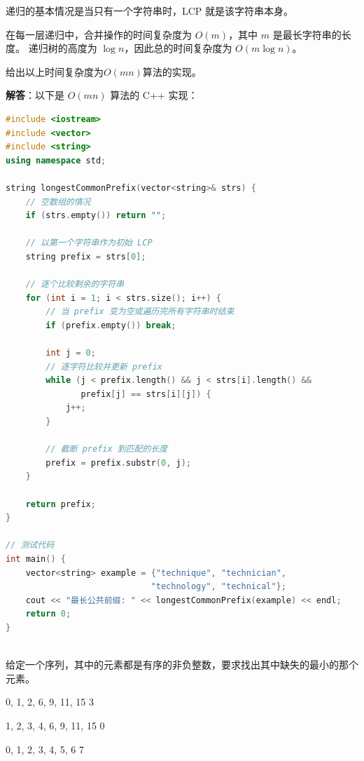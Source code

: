 \documentclass[12pt,twoside]{article}
\begin{document}
\begin{problems}
递归的基本情况是当只有一个字符串时，LCP 就是该字符串本身。

在每一层递归中，合并操作的时间复杂度为 $O(m)$，其中 $m$ 是最长字符串的长度。
递归树的高度为 $\log n$，因此总的时间复杂度为 $O(m \log n)$。

\ppart 给出以上时间复杂度为$O(mn)$算法的实现。

\textbf{解答}：以下是 $O(mn)$ 算法的 C++ 实现：

\begin{lstlisting}[language=C++]
#include <iostream>
#include <vector>
#include <string>
using namespace std;

string longestCommonPrefix(vector<string>& strs) {
    // 空数组的情况
    if (strs.empty()) return "";
    
    // 以第一个字符串作为初始 LCP
    string prefix = strs[0];
    
    // 逐个比较剩余的字符串
    for (int i = 1; i < strs.size(); i++) {
        // 当 prefix 变为空或遍历完所有字符串时结束
        if (prefix.empty()) break;
        
        int j = 0;
        // 逐字符比较并更新 prefix
        while (j < prefix.length() && j < strs[i].length() && 
               prefix[j] == strs[i][j]) {
            j++;
        }
        
        // 截断 prefix 到匹配的长度
        prefix = prefix.substr(0, j);
    }
    
    return prefix;
}

// 测试代码
int main() {
    vector<string> example = {"technique", "technician", 
                             "technology", "technical"};
    cout << "最长公共前缀: " << longestCommonPrefix(example) << endl;
    return 0;
}
\end{lstlisting}
\eparts


\newpage
{} \\
给定一个序列，其中的元素都是有序的非负整数，要求找出其中缺失的最小的那个元素。

\begin{probexamples}
   {0, 1, 2, 6, 9, 11, 15}
   {3}
   {}
\end{probexamples}

\begin{probexamples}
   {1, 2, 3, 4, 6, 9, 11, 15}
   {0}
   {}
\end{probexamples}

\begin{probexamples}
   {0, 1, 2, 3, 4, 5, 6}
   {7}
   {}
\end{probexamples}


\end{problems}
\end{document}
